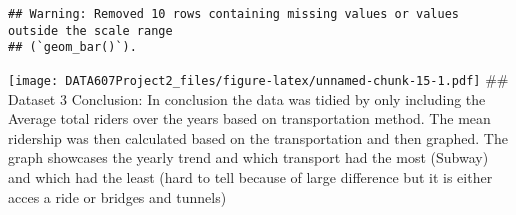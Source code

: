 \documentclass[
]{article}
\begin{document}
\begin{verbatim}
## Warning: Removed 10 rows containing missing values or values outside the scale range
## (`geom_bar()`).
\end{verbatim}

\texttt{[image: DATA607Project2\_files/figure-latex/unnamed-chunk-15-1.pdf]}
\#\# Dataset 3 Conclusion: In conclusion the data was tidied by only
including the Average total riders over the years based on
transportation method. The mean ridership was then calculated based on
the transportation and then graphed. The graph showcases the yearly
trend and which transport had the most (Subway) and which had the least
(hard to tell because of large difference but it is either acces a ride
or bridges and tunnels)
\end{document}
